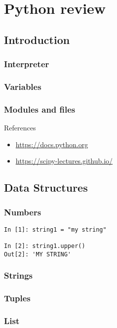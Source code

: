 \chapter{Python review}

\section{Introduction}

\subsection{Interpreter}
\subsection{Variables}
\subsection{Modules and files}

References
\begin{itemize}
\item \url{https://docs.python.org}
\item \url{https://scipy-lectures.github.io/}
\end{itemize}


\section{Data Structures}

\subsection{Numbers}

\begin{verbatim}
In [1]: string1 = "my string"

In [2]: string1.upper()
Out[2]: 'MY STRING'
\end{verbatim}

\subsection{Strings}
\subsection{Tuples}
\subsection{List}
